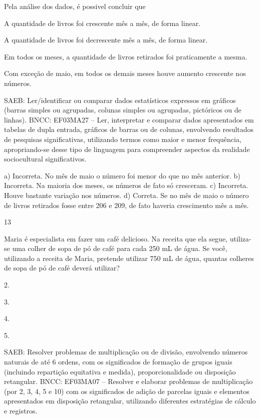 \begin{multicols}{2}
\begin{enumerate}
{Pela análise dos dados, é possivel concluir que

\begin{escolha}
\item
  A quantidade de livros foi crescente mês a mês, de forma linear.
\item
  A quantidade de livros foi decrescente mês a mês, de forma linear.
\item
  Em todos os meses, a quantidade de livros retirados foi praticamente a mesma.
\item
  Com exceção de maio, em todos os demais meses houve aumento crescente nos números.
\end{escolha}

SAEB: Ler/identificar ou comparar dados estatísticos
expressos em gráficos (barras simples ou agrupadas, colunas simples ou
agrupadas, pictóricos ou de linhas).
BNCC: EF03MA27 -- Ler, interpretar e comparar dados apresentados em tabelas de dupla entrada,
gráficos de barras ou de colunas, envolvendo resultados de pesquisas significativas, utilizando
termos como maior e menor frequência, apropriando-se desse tipo de linguagem para compreender aspectos da realidade sociocultural significativos.

a) Incorreta. No mês de maio o número foi menor do que no mês anterior.
b) Incorreta. Na maioria dos meses, os números de fato só cresceram.
c) Incorreta. Houve bastante variação nos números.
d) Correta. Se no mês de maio o número de livros retirados fosse entre 206 e 209, de fato haveria crescimento mês a mês.

\num{13}

Maria é especialista em fazer um café delicioso. Na receita que ela segue, utiliza-se uma colher de sopa de pó de café para cada 250 mL de água. Se você, utilizando a receita de Maria, pretende utilizar 750 mL de água, quantas colheres de sopa de pó de café deverá utilizar?

\begin{escolha}
\item
  2.
\item
  3.
\item
  4.
\item
  5.
\end{escolha}

SAEB: Resolver problemas de multiplicação ou de divisão, envolvendo números naturais de até 6 ordens, com os significados de formação de grupos iguais (incluindo repartição equitativa e medida), proporcionalidade ou disposição retangular.
BNCC: EF03MA07 – Resolver e elaborar problemas de multiplicação (por 2, 3, 4, 5 e 10) com os
significados de adição de parcelas iguais e elementos apresentados em disposição retangular,
utilizando diferentes estratégias de cálculo e registros.

}
\end{enumerate}
\end{multicols}
